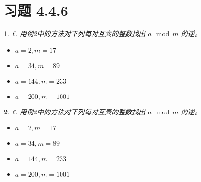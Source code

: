 \documentclass[UTF8]{report}
\theoremstyle{MyLineTheoremStyle} %
\theoremstyle{MyBlockTheoremStyle} %
\theoremstyle{MySubsubsectionStyle} %
\newtheorem{definition}{}
\begin{document}
\section{习题 4.4.6}

\begin{definition}
    6. 用例2中的方法对下列每对互素的整数找出 \( a \mod m \) 的逆。
    \begin{itemize}
        \item[a)] \( a = 2, m = 17 \)
        \item[b)] \( a = 34, m = 89 \)
        \item[c)] \( a = 144, m = 233 \)
        \item[d)] \( a = 200, m = 1001 \)
    \end{itemize}
\end{definition}

\begin{definition}
    6. 用例2中的方法对下列每对互素的整数找出 \( a \mod m \) 的逆。
    \begin{itemize}
        \item[a)] \( a = 2, m = 17 \)
        \item[b)] \( a = 34, m = 89 \)
        \item[c)] \( a = 144, m = 233 \)
        \item[d)] \( a = 200, m = 1001 \)
    \end{itemize}
\end{definition}
\end{document}
